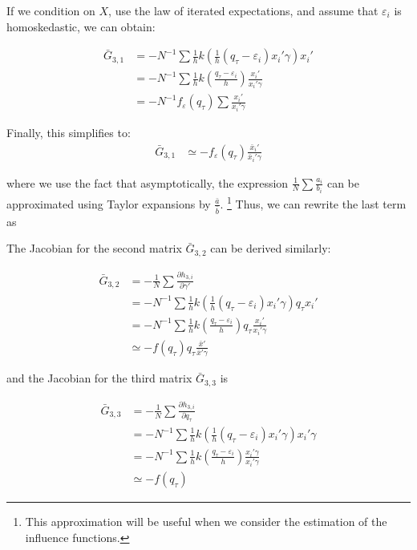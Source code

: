 \documentclass[
  authoryear,
  review,
  1p]{elsarticle}
\begin{document}
If we condition on \(X\), use the law of iterated expectations, and
assume that \(\varepsilon_i\) is homoskedastic, we can obtain:

\[\begin{aligned}
\bar G_{3,1} &= -N^{-1} \sum \frac{1}{h} k\left( \frac{1}{h} ( q_\tau - \varepsilon_i ) x_i'\gamma  \right) x_i'  \\
             &= -N^{-1} \sum \frac{1}{h} k\left( \frac{q_\tau - \varepsilon_i}{h}  \right)  \frac{x_i'}{x_i'\gamma}  \\
             &= -N^{-1} f_\varepsilon (q_\tau) \sum  \frac{x_i'}{x_i'\gamma}  
\end{aligned}
\]

Finally, this simplifies to: \[\begin{aligned}
\bar G_{3,1} &\simeq -  f_\varepsilon (q_\tau) \frac{\bar x_i'}{ \bar x_i' \gamma} 
\end{aligned}
\]

where we use the fact that asymptotically, the expression
\(\frac{1}{N}\sum \frac{a_i}{b_i}\) can be approximated using Taylor
expansions by \(\frac{\bar a}{\bar b}\). \footnote{This approximation
  will be useful when we consider the estimation of the influence
  functions.} Thus, we can rewrite the last term as

The Jacobian for the second matrix \(\bar G_{3,2}\) can be derived
similarly:

\[\begin{aligned}
\bar G_{3,2} &= -\frac{1}{N} \sum \frac{\partial h_{3,i}}{\partial \gamma'} \\
             &= -N^{-1} \sum \frac{1}{h} k\left( \frac{1}{h} ( q_\tau - \varepsilon_i ) x_i'\gamma  \right) q_\tau x_i'  \\
             &= -N^{-1} \sum \frac{1}{h} k\left( \frac{q_\tau - \varepsilon_i}{h}    \right) q_\tau \frac{x_i'}{x_i'\gamma}  \\
             &\simeq  -  f(q_\tau)  q_\tau \frac{\bar x'}{\bar x'\gamma}
\end{aligned}
\]

and the Jacobian for the third matrix \(\bar G_{3,3}\) is

\[\begin{aligned}
\bar G_{3,3} &= -\frac{1}{N} \sum \frac{\partial h_{3,i}}{\partial q_\tau} \\
             &= -N^{-1} \sum \frac{1}{h} k\left( \frac{1}{h} ( q_\tau - \varepsilon_i ) x_i'\gamma  \right) x_i'\gamma  \\
             &= -N^{-1} \sum \frac{1}{h} k\left( \frac{q_\tau - \varepsilon_i}{h}   \right) \frac{x_i'\gamma}{x_i'\gamma}  \\
             &\simeq  -  f(q_\tau)  
\end{aligned}
\]
\end{document}
